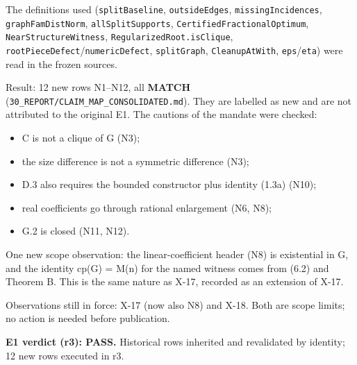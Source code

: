 \documentclass[
]{article}
\providecommand{\tightlist}{%
  \setlength{\itemsep}{0pt}\setlength{\parskip}{0pt}}
\begin{document}
The definitions used (\texttt{splitBaseline}, \texttt{outsideEdges},
\texttt{missingIncidences}, \texttt{graphFamDistNorm},
\texttt{allSplitSupports}, \texttt{CertifiedFractionalOptimum},
\texttt{NearStructureWitness}, \texttt{RegularizedRoot.isClique},
\texttt{rootPieceDefect}/\texttt{numericDefect}, \texttt{splitGraph},
\texttt{CleanupAtWith}, \texttt{eps}/\texttt{eta}) were read in the
frozen sources.

Result: 12 new rows N1--N12, all \textbf{MATCH}
(\texttt{30\_REPORT/CLAIM\_MAP\_CONSOLIDATED.md}). They are labelled as
new and are not attributed to the original E1. The cautions of the
mandate were checked:

\begin{itemize}
\tightlist
\item
  C is not a clique of G (N3);
\item
  the size difference is not a symmetric difference (N3);
\item
  D.3 also requires the bounded constructor plus identity (1.3a) (N10);
\item
  real coefficients go through rational enlargement (N6, N8);
\item
  G.2 is closed (N11, N12).
\end{itemize}

One new scope observation: the linear-coefficient header (N8) is
existential in G, and the identity cp(G) = M(n) for the named witness
comes from (6.2) and Theorem B. This is the same nature as X-17,
recorded as an extension of X-17.

Observations still in force: X-17 (now also N8) and X-18. Both are scope
limits; no action is needed before publication.

\textbf{E1 verdict (r3): PASS.} Historical rows inherited and
revalidated by identity; 12 new rows executed in r3.
\end{document}
